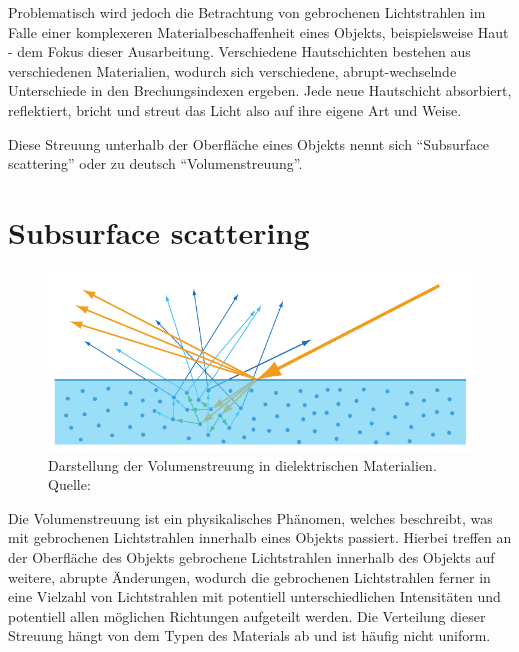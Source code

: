 \documentclass[ngerman,runningheads,a4paper]{llncs}[2018/03/10]
\begin{document}
Problematisch wird jedoch die Betrachtung von gebrochenen Lichtstrahlen im Falle einer komplexeren Materialbeschaffenheit eines Objekts, beispielsweise Haut - dem Fokus dieser Ausarbeitung.
Verschiedene Hautschichten bestehen aus verschiedenen Materialien, wodurch sich verschiedene, abrupt-wechselnde Unterschiede in den Brechungsindexen ergeben.
Jede neue Hautschicht absorbiert, reflektiert, bricht und streut das Licht also auf ihre eigene Art und Weise.

Diese Streuung unterhalb der Oberfläche eines Objekts nennt sich \enquote{Subsurface scattering} oder zu deutsch \enquote{Volumenstreuung}.

\section{Subsurface scattering}
\label{sec:subsurface}

\begin{figure}
  \centering
  \includegraphics[scale=0.4,keepaspectratio]{./images/subsurface-scattering-illustration.jpg}
  \caption{Darstellung der Volumenstreuung in dielektrischen Materialien. Quelle: \cite{real-time-rendering}}
  \label{fig:subsurface-scattering}
\end{figure}

Die Volumenstreuung ist ein physikalisches Phänomen, welches beschreibt, was mit gebrochenen Lichtstrahlen innerhalb eines Objekts passiert.
Hierbei treffen an der Oberfläche des Objekts gebrochene Lichtstrahlen innerhalb des Objekts auf weitere, abrupte Änderungen, wodurch die gebrochenen Lichtstrahlen ferner in eine Vielzahl von Lichtstrahlen mit potentiell unterschiedlichen Intensitäten und potentiell allen möglichen Richtungen aufgeteilt werden.
Die Verteilung dieser Streuung hängt von dem Typen des Materials ab und ist häufig nicht uniform.
\end{document}
